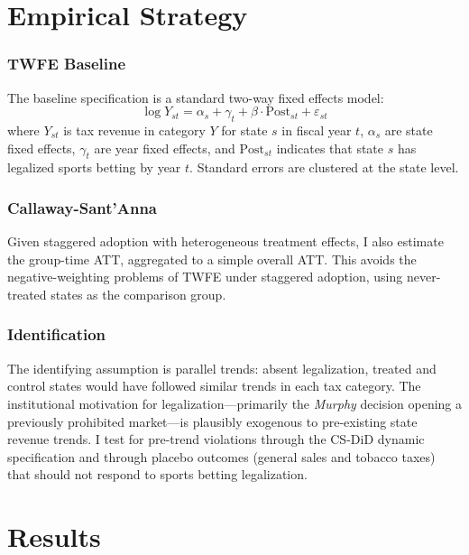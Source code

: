 \documentclass[12pt]{article}
\begin{document}


\section{Empirical Strategy}

\subsubsection*{TWFE Baseline} The baseline specification is a standard two-way fixed effects model:
\begin{equation}
  \log Y_{st} = \alpha_s + \gamma_t + \beta \cdot \text{Post}_{st} + \varepsilon_{st}
\end{equation}
where $Y_{st}$ is tax revenue in category $Y$ for state $s$ in fiscal year $t$, $\alpha_s$ are state fixed effects, $\gamma_t$ are year fixed effects, and $\text{Post}_{st}$ indicates that state $s$ has legalized sports betting by year $t$. Standard errors are clustered at the state level.

\subsubsection*{Callaway-Sant'Anna} Given staggered adoption with heterogeneous treatment effects, I also estimate the \citet{callaway2021difference} group-time ATT, aggregated to a simple overall ATT. This avoids the negative-weighting problems of TWFE under staggered adoption, using never-treated states as the comparison group.

\subsubsection*{Identification} The identifying assumption is parallel trends: absent legalization, treated and control states would have followed similar trends in each tax category. The institutional motivation for legalization---primarily the \textit{Murphy} decision opening a previously prohibited market---is plausibly exogenous to pre-existing state revenue trends. I test for pre-trend violations through the CS-DiD dynamic specification and through placebo outcomes (general sales and tobacco taxes) that should not respond to sports betting legalization.

\section{Results}
\end{document}
